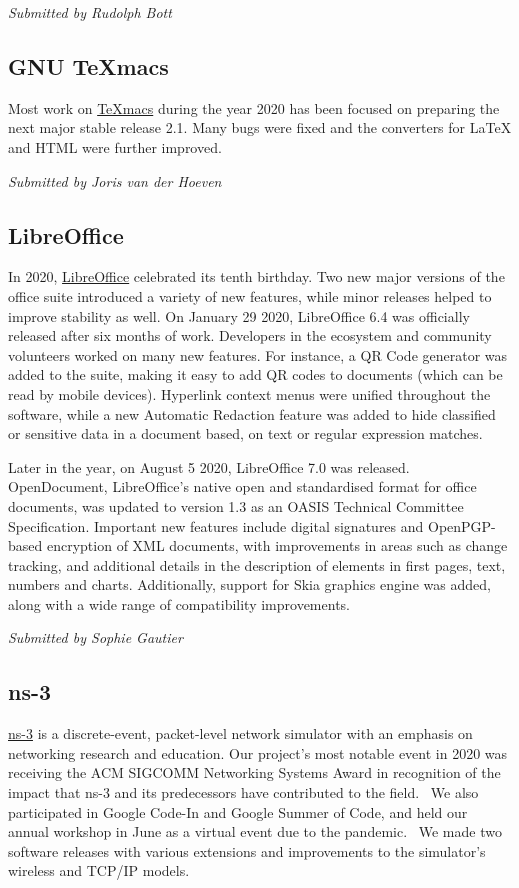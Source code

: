 \documentclass[a4paper]{report}
\begin{document}
{\em Submitted by Rudolph Bott}

\subsection{GNU TeXmacs}

Most work on \href{https://www.texmacs.org/}{TeXmacs} during the year 2020 has been focused on preparing the next major stable release 2.1.  Many bugs were fixed and the converters for LaTeX and HTML were further improved.

{\em Submitted by Joris van der Hoeven}

\subsection{LibreOffice}

In 2020, \href{https://www.libreoffice.org/}{LibreOffice} celebrated its tenth birthday. Two new major versions of the office suite introduced a variety of new features, while minor releases helped to improve stability as well. On January 29 2020, LibreOffice 6.4 was officially released after six months of work. Developers in the ecosystem and community volunteers worked on many new features. For instance, a QR Code generator was added to the suite, making it easy to add QR codes to documents (which can be read by mobile devices).  Hyperlink context menus were unified throughout the software, while a new Automatic Redaction feature was added to hide classified or sensitive data in a document based, on text or regular expression matches.

Later in the year, on August 5 2020, LibreOffice 7.0 was released.  OpenDocument, LibreOffice's native open and standardised format for office documents, was updated to version 1.3 as an OASIS Technical Committee Specification. Important new features include digital signatures and OpenPGP-based encryption of XML documents, with improvements in areas such as change tracking, and additional details in the description of elements in first pages, text, numbers and charts.  Additionally, support for Skia graphics engine was added, along with a wide range of compatibility improvements.

{\em Submitted by Sophie Gautier}

\subsection{ns-3}

\href{https://www.nsnam.org/}{ns-3} is a discrete-event, packet-level network simulator with an emphasis on networking research and education.  Our project's most notable event in 2020 was receiving the ACM SIGCOMM Networking Systems Award in recognition of the impact that ns-3 and its predecessors have contributed to the field.  We also participated in Google Code-In and Google Summer of Code, and held our annual workshop in June as a virtual event due to the pandemic.  We made two software releases with various extensions and improvements to the simulator's wireless and TCP/IP models.
\end{document}
